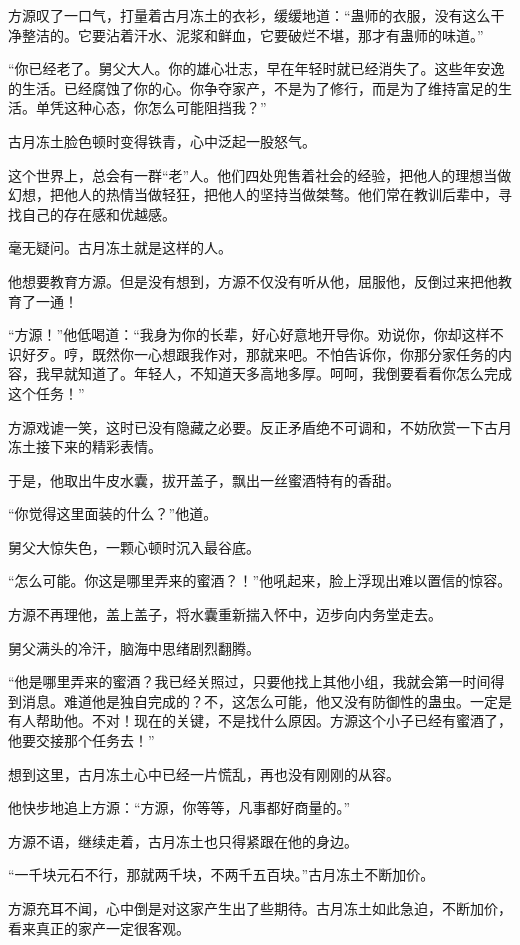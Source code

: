 \begin{this_body}
方源叹了一口气，打量着古月冻土的衣衫，缓缓地道：“蛊师的衣服，没有这么干净整洁的。它要沾着汗水、泥浆和鲜血，它要破烂不堪，那才有蛊师的味道。”

“你已经老了。舅父大人。你的雄心壮志，早在年轻时就已经消失了。这些年安逸的生活。已经腐蚀了你的心。你争夺家产，不是为了修行，而是为了维持富足的生活。单凭这种心态，你怎么可能阻挡我？”

古月冻土脸色顿时变得铁青，心中泛起一股怒气。

这个世界上，总会有一群“老”人。他们四处兜售着社会的经验，把他人的理想当做幻想，把他人的热情当做轻狂，把他人的坚持当做桀骜。他们常在教训后辈中，寻找自己的存在感和优越感。

毫无疑问。古月冻土就是这样的人。

他想要教育方源。但是没有想到，方源不仅没有听从他，屈服他，反倒过来把他教育了一通！

“方源！”他低喝道：“我身为你的长辈，好心好意地开导你。劝说你，你却这样不识好歹。哼，既然你一心想跟我作对，那就来吧。不怕告诉你，你那分家任务的内容，我早就知道了。年轻人，不知道天多高地多厚。呵呵，我倒要看看你怎么完成这个任务！”

方源戏谑一笑，这时已没有隐藏之必要。反正矛盾绝不可调和，不妨欣赏一下古月冻土接下来的精彩表情。

于是，他取出牛皮水囊，拔开盖子，飘出一丝蜜酒特有的香甜。

“你觉得这里面装的什么？”他道。

舅父大惊失色，一颗心顿时沉入最谷底。

“怎么可能。你这是哪里弄来的蜜酒？！”他吼起来，脸上浮现出难以置信的惊容。

方源不再理他，盖上盖子，将水囊重新揣入怀中，迈步向内务堂走去。

舅父满头的冷汗，脑海中思绪剧烈翻腾。

“他是哪里弄来的蜜酒？我已经关照过，只要他找上其他小组，我就会第一时间得到消息。难道他是独自完成的？不，这怎么可能，他又没有防御性的蛊虫。一定是有人帮助他。不对！现在的关键，不是找什么原因。方源这个小子已经有蜜酒了，他要交接那个任务去！”

想到这里，古月冻土心中已经一片慌乱，再也没有刚刚的从容。

他快步地追上方源：“方源，你等等，凡事都好商量的。”

方源不语，继续走着，古月冻土也只得紧跟在他的身边。

“一千块元石不行，那就两千块，不两千五百块。”古月冻土不断加价。

方源充耳不闻，心中倒是对这家产生出了些期待。古月冻土如此急迫，不断加价，看来真正的家产一定很客观。


\end{this_body}
